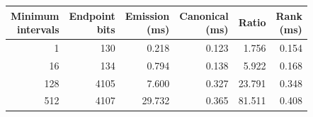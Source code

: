 \begingroup
\small
\setlength{\tabcolsep}{5pt}
\renewcommand{\arraystretch}{1.12}
\begin{tabular}{@{}rrrrrr@{}}
\toprule
\shortstack{Minimum\\intervals} & \shortstack{Endpoint\\bits} & \shortstack{Emission\\(ms)} & \shortstack{Canonical\\(ms)} & Ratio & \shortstack{Rank\\(ms)} \\
\midrule
1 & 130 & 0.218 & 0.123 & 1.756 & 0.154 \\
16 & 134 & 0.794 & 0.138 & 5.922 & 0.168 \\
128 & 4105 & 7.600 & 0.327 & 23.791 & 0.348 \\
512 & 4107 & 29.732 & 0.365 & 81.511 & 0.408 \\
\bottomrule
\end{tabular}
\endgroup
